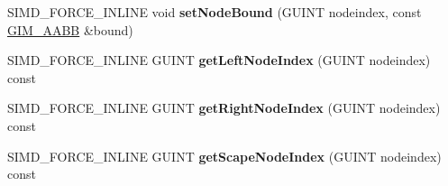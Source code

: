 \begin{DoxyCompactItemize}
S\+I\+M\+D\+\_\+\+F\+O\+R\+C\+E\+\_\+\+I\+N\+L\+I\+NE void {\bfseries set\+Node\+Bound} (G\+U\+I\+NT nodeindex, const \hyperlink{classGIM__AABB}{G\+I\+M\+\_\+\+A\+A\+BB} \&bound)
\item 
\mbox{\label{classGIM__BOX__TREE_a890bb51dca18c702cd7a8fb308749f7b}} 
S\+I\+M\+D\+\_\+\+F\+O\+R\+C\+E\+\_\+\+I\+N\+L\+I\+NE G\+U\+I\+NT {\bfseries get\+Left\+Node\+Index} (G\+U\+I\+NT nodeindex) const
\item 
\mbox{\label{classGIM__BOX__TREE_aee99cdf538eea3240684a9952c6a667e}} 
S\+I\+M\+D\+\_\+\+F\+O\+R\+C\+E\+\_\+\+I\+N\+L\+I\+NE G\+U\+I\+NT {\bfseries get\+Right\+Node\+Index} (G\+U\+I\+NT nodeindex) const
\item 
\mbox{\label{classGIM__BOX__TREE_a361ee526551fe12ac3edfb9b2f8b2dc9}} 
S\+I\+M\+D\+\_\+\+F\+O\+R\+C\+E\+\_\+\+I\+N\+L\+I\+NE G\+U\+I\+NT {\bfseries get\+Scape\+Node\+Index} (G\+U\+I\+NT nodeindex) const
\end{DoxyCompactItemize}

